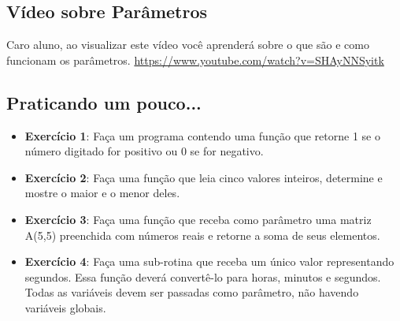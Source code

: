 \documentclass{article}
\begin{document}
\subsection{Vídeo sobre Parâmetros}
Caro aluno, ao visualizar este vídeo você aprenderá sobre o que são e como funcionam os parâmetros.
\href{https://www.youtube.com/watch?v=SHAyNNSyitk}{https://www.youtube.com/watch?v=SHAyNNSyitk}

\subsection{Praticando um pouco...}
\begin{itemize}
    \item \textbf{Exercício 1}: Faça um programa contendo uma função que retorne 1 se o número digitado for positivo ou 0 se for negativo.
    \item \textbf{Exercício 2}: Faça uma função que leia cinco valores inteiros, determine e mostre o maior e o menor deles.
    \item \textbf{Exercício 3}: Faça uma função que receba como parâmetro uma matriz A(5,5) preenchida com números reais e retorne a soma de seus elementos.
    \item \textbf{Exercício 4}: Faça uma sub-rotina que receba um único valor representando segundos. Essa função deverá convertê-lo para horas,  minutos e segundos. Todas as variáveis devem ser passadas como parâmetro, não havendo variáveis globais.
\end{itemize}
\end{document}
